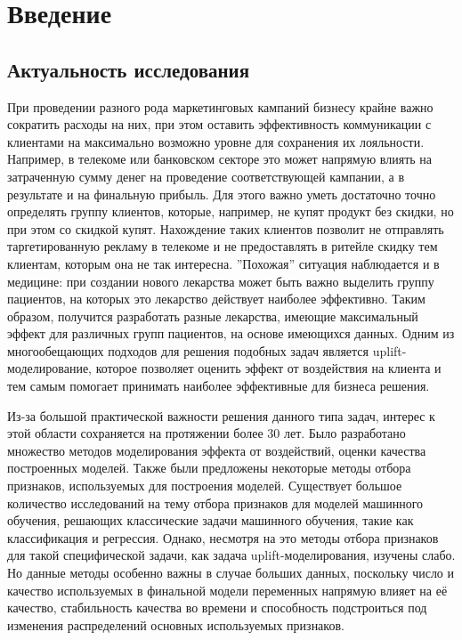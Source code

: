 \section{Введение}













\subsection{Актуальность исследования}

При проведении разного рода маркетинговых кампаний бизнесу крайне важно сократить расходы на них, при этом оставить эффективность коммуникации с клиентами на максимально возможно уровне для сохранения их лояльности. Например, в телекоме или банковском секторе это может напрямую влиять на затраченную сумму денег на проведение соответствующей кампании, а в результате и на финальную прибыль. Для этого важно уметь достаточно точно определять группу клиентов, которые, например, не купят продукт без скидки, но при этом со скидкой купят. Нахождение таких клиентов позволит не отправлять таргетированную рекламу в телекоме и не предоставлять в ритейле скидку тем клиентам, которым она не так интересна. ''Похожая'' ситуация наблюдается и в медицине: при создании нового лекарства может быть важно выделить группу пациентов, на которых это лекарство действует наиболее эффективно. Таким образом, получится разработать разные лекарства, имеющие максимальный эффект для различных групп пациентов, на основе имеющихся данных. Одним из многообещающих подходов для решения подобных задач является uplift-моделирование, которое позволяет оценить эффект от воздействия на клиента и тем самым помогает принимать наиболее эффективные для бизнеса решения.

Из-за большой практической важности решения данного типа задач, интерес к этой области сохраняется на протяжении более 30 лет. Было разработано множество методов моделирования эффекта от воздействий, оценки качества построенных моделей. Также были предложены некоторые методы отбора признаков, используемых для построения моделей. Существует большое количество исследований на тему отбора признаков для моделей машинного обучения, решающих классические задачи машинного обучения, такие как классификация и регрессия. Однако, несмотря на это методы отбора признаков для такой специфической задачи, как задача uplift-моделирования, изучены слабо. Но данные методы особенно важны в случае больших данных, поскольку число и качество используемых в финальной модели переменных напрямую влияет на её качество, стабильность качества во времени и способность подстроиться под изменения распределений основных используемых признаков.

